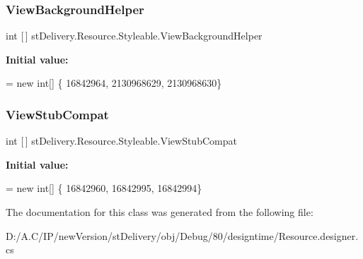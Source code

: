 \subsubsection{\texorpdfstring{View\+Background\+Helper}{ViewBackgroundHelper}}
{\footnotesize\ttfamily int \mbox{[}$\,$\mbox{]} st\+Delivery.\+Resource.\+Styleable.\+View\+Background\+Helper\hspace{0.3cm}{\ttfamily [static]}}

{\bfseries Initial value\+:}
\begin{DoxyCode}
= \textcolor{keyword}{new} \textcolor{keywordtype}{int}[] \{
                    16842964,
                    2130968629,
                    2130968630\}
\end{DoxyCode}
\mbox{\label{classst_delivery_1_1_resource_1_1_styleable_a8b85b2162f3ae289805a8341a16ee630}} 
\subsubsection{\texorpdfstring{View\+Stub\+Compat}{ViewStubCompat}}
{\footnotesize\ttfamily int \mbox{[}$\,$\mbox{]} st\+Delivery.\+Resource.\+Styleable.\+View\+Stub\+Compat\hspace{0.3cm}{\ttfamily [static]}}

{\bfseries Initial value\+:}
\begin{DoxyCode}
= \textcolor{keyword}{new} \textcolor{keywordtype}{int}[] \{
                    16842960,
                    16842995,
                    16842994\}
\end{DoxyCode}


The documentation for this class was generated from the following file\+:\begin{DoxyCompactItemize}
\item 
D\+:/\+A.\+C/\+I\+P/new\+Version/st\+Delivery/obj/\+Debug/80/designtime/Resource.\+designer.\+cs\end{DoxyCompactItemize}
